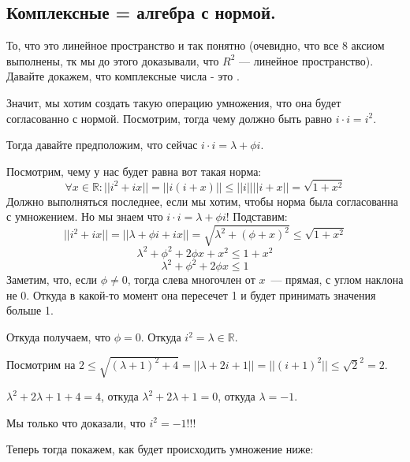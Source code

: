 \subsection{Комплексные = алгебра с нормой.}

То, что это линейное пространство и так понятно (очевидно, что все 8 аксиом выполнены, тк мы до этого доказывали, что \(R^2\) --- линейное пространство). Давайте докажем, что комплексные числа - это .

Значит, мы хотим создать такую операцию умножения, что она будет согласованно с нормой. Посмотрим, тогда чему должно быть равно \(i\cdot i = i^2\).

Тогда давайте предположим, что сейчас \(i\cdot i = \lambda + \phi i\).

Посмотрим, чему у нас будет равна вот такая норма:
$$ \forall x \in \mathbb{R} : ||i^2 + ix|| = ||i (i + x)|| \leq ||i|| ||i + x|| = \sqrt{1 + x^2} $$
Должно выполняться последнее, если мы хотим, чтобы норма была согласованна с умножением. Но мы знаем что  \(i\cdot i = \lambda + \phi i\)! Подставим:
$$||i^2+ix|| = || \lambda + \phi i + ix|| = \sqrt{\lambda^2 + (\phi+x)^2} \leq \sqrt{1+x^2}$$
$$\lambda^2 + \phi^2+2\phi x+x^2 \leq 1+x^2$$
$$\lambda^2 + \phi^2+2\phi x \leq 1$$
Заметим, что, если \(\phi\neq 0\), тогда слева многочлен от \(x\)~--- прямая, с углом наклона не 0. Откуда в какой-то момент она пересечет 1 и будет принимать значения больше 1.

Откуда получаем, что \(\phi=0\). Откуда $i^2 = \lambda \in \mathbb{R}$.

Посмотрим на \(2 \leq \sqrt{(\lambda+1)^2+4}=||\lambda + 2i + 1||=||(i+1)^2||\leq \sqrt{2}^2 = 2\).

\(\lambda^2+2\lambda+1+4=4\), откуда  \(\lambda^2+2\lambda+1=0 \), откуда \(\lambda = -1\).

Мы  только что доказали, что \(i^2 =-1\)!!!

Теперь тогда покажем, как будет происходить умножение ниже:
